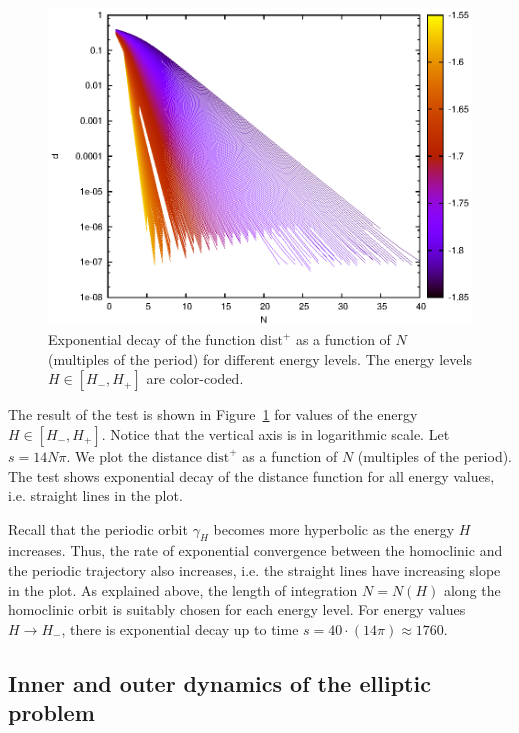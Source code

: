 \begin{figure}
\includegraphics{figs/outer_circ_test}
\caption{Exponential decay of the function $\mathrm{dist}^+$ as a function of
$N$ (multiples of the period) for different energy levels.
The energy levels $H\in[H_-,H_+]$ are color-coded.}
\label{fig:outer_circ_test}
\end{figure}

The result of the test is shown in Figure~\ref{fig:outer_circ_test}
for values of the energy $H\in[H_-,H_+]$.  
Notice that the vertical axis is in logarithmic scale. 
Let $s=14N\pi$. 
We plot the distance $\mathrm{dist}^+$ as a function of $N$ (multiples of the
period). 
The test shows exponential decay of the distance function for all
energy values, i.e. straight lines in the plot. 

Recall that the periodic orbit $\gamma_H$ becomes more hyperbolic as
the energy $H$ increases. Thus, the rate of exponential convergence
between the homoclinic and the periodic trajectory also increases,
i.e. the straight lines have increasing slope in the plot.
As explained above, the length of integration $N=N(H)$ along the
homoclinic orbit is suitably chosen for each energy level.
For energy values $H\to H_-$, there is exponential decay up to
time $s=40\cdot (14\pi) \approx 1760$.



\subsection{Inner and outer dynamics of the elliptic problem}
\label{app:InnerOuterElliptic}

